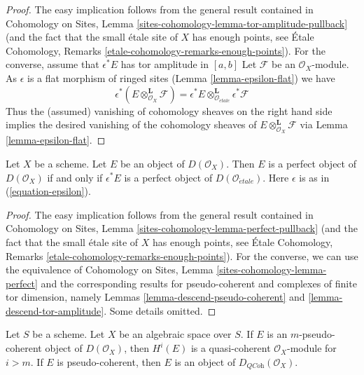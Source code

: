 \begin{proof}
The easy implication follows from the general result contained in
Cohomology on Sites, Lemma \ref{sites-cohomology-lemma-tor-amplitude-pullback}
(and the fact that the small \'etale site of $X$ has enough points, see
\'Etale Cohomology, Remarks \ref{etale-cohomology-remarks-enough-points}).
For the converse, assume that $\epsilon^*E$ has tor amplitude in $[a, b]$
Let $\mathcal{F}$ be an $\mathcal{O}_X$-module. As $\epsilon$ is a flat
morphism of ringed sites (Lemma \ref{lemma-epsilon-flat})
we have
$$
\epsilon^*(E \otimes^\mathbf{L}_{\mathcal{O}_X} \mathcal{F})
=
\epsilon^*E
\otimes^\mathbf{L}_{\mathcal{O}_{\acute{e}tale}}
\epsilon^*\mathcal{F}
$$
Thus the (assumed) vanishing of cohomology sheaves on the right hand side
implies the desired vanishing of the cohomology sheaves of
$E \otimes^\mathbf{L}_{\mathcal{O}_X} \mathcal{F}$ via
Lemma \ref{lemma-epsilon-flat}.
\end{proof}

\begin{lemma}
\label{lemma-descend-perfect}
Let $X$ be a scheme. Let $E$ be an object of $D(\mathcal{O}_X)$.
Then $E$ is a perfect object of $D(\mathcal{O}_X)$ if and only if
$\epsilon^*E$ is a perfect object of $D(\mathcal{O}_{\acute{e}tale})$.
Here $\epsilon$ is as in (\ref{equation-epsilon}).
\end{lemma}

\begin{proof}
The easy implication follows from the general result contained in
Cohomology on Sites, Lemma \ref{sites-cohomology-lemma-perfect-pullback}
(and the fact that the small \'etale site of $X$ has enough points, see
\'Etale Cohomology, Remarks \ref{etale-cohomology-remarks-enough-points}).
For the converse, we can use the equivalence of
Cohomology on Sites, Lemma \ref{sites-cohomology-lemma-perfect}
and the corresponding results for pseudo-coherent and complexes of
finite tor dimension, namely
Lemmas \ref{lemma-descend-pseudo-coherent} and
\ref{lemma-descend-tor-amplitude}.
Some details omitted.
\end{proof}

\begin{lemma}
\label{lemma-pseudo-coherent}
Let $S$ be a scheme. Let $X$ be an algebraic space over $S$.
If $E$ is an $m$-pseudo-coherent object of $D(\mathcal{O}_X)$,
then $H^i(E)$ is a quasi-coherent $\mathcal{O}_X$-module for $i > m$.
If $E$ is pseudo-coherent, then $E$ is an object of
$D_{\textit{QCoh}}(\mathcal{O}_X)$.
\end{lemma}

